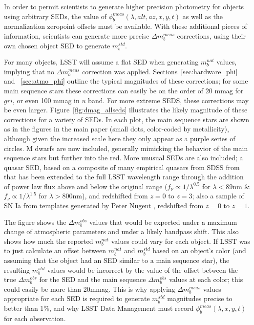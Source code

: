 \documentclass[12pt,preprint]{aastex}
\begin{document}
In order to permit scientists to generate higher precision photometry
for objects using arbitrary SEDs, the value of
$\phi_b^{meas}(\lambda,alt,az,x,y,t)$ as well as the normalization
zeropoint offsets must be available. With these additional pieces of
information, scientists can generate more precise $\Delta m_b^{meas}$
corrections, using their own chosen object SED to generate
$m_b^{std}$.

For many objects, LSST will assume a flat SED when generating
$m_b^{nat}$ values, implying that no $\Delta m_b^{meas}$
correction was applied. Sections~\ref{sec:hardware_phi} and
~\ref{sec:atmo_phi} outline the typical magnitudes of these corrections;
for some main sequence stars these corrections can easily be on the
order of 20 mmag for $gri$, or even 100 mmag in $u$ band. For more
extreme SEDS, these corrections may be even
larger. Figure~\ref{fig:dmag_allseds} illustrates the likely magnitude of
these corrections for a variety of SEDs. In each plot, the main
sequence stars are shown as in the figures in the main paper (small
dots, color-coded by metallicity), although given the increased scale
here they only appear as a purple series of circles. M dwarfs are now
included, generally mimicking the behavior of the main sequence stars but
further into the red. More unusual SEDs are also
included; a quasar SED, based on a composite of many empirical quasars
from SDSS from \citet{VandenBerk2001} that has been extended to the
full LSST wavelength range through the addition of power law flux
above and below the original range ($f_\nu \propto 1/\lambda^{0.5}$
for $\lambda<89$nm \& $f_\nu \propto 1/\lambda^{1.5}$ for
$\lambda>800$nm), and redshifted from $z=0$ to $z=3$; also a sample of
SN Ia from templates generated by Peter Nugent \citep{Nugent2002}, redshifted
from $z=0$ to $z=1$.  

The figure shows the $\Delta m_b^{obs}$ values that would be expected
under a maximum change of atmospheric parameters and under a likely
bandpass shift. This also shows how much the reported $m_b^{nat}$
values could vary for each object. If LSST was to just calculate an
offset between $m_b^{nat}$ and $m_b^{std}$ based on an object's color
(and assuming that the object had an SED similar to a main sequence
star), the resulting $m_b^{std}$ values would be incorrect by the
value of the offset between the true $\Delta m_b^{obs}$ for the SED
and the main sequence $\Delta m_b^{obs}$ values at each color; this
could easily be more than 20mmag.  This is why applying $\Delta
m_b^{meas}$ values appropriate for each SED is required to generate
$m_b^{std}$ magnitudes precise to better than 1\%, and why LSST Data
Management must record $\phi_b^{meas}(\lambda,x,y,t)$ for each
observation. 
\end{document}
